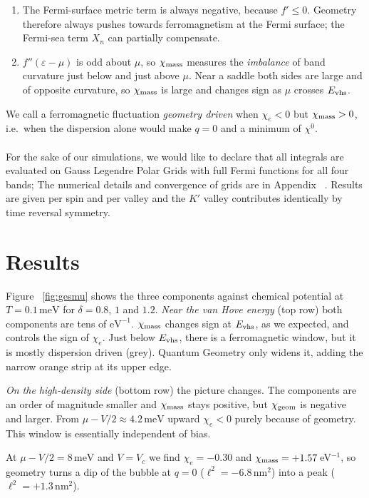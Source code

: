 \documentclass[11pt,a4paper]{article}
\numberwithin{equation}{section}
\newcommand{\chie}{\chi_{e}}
\newcommand{\chig}{\chi_{\rm geom}}
\newcommand{\chim}{\chi_{\rm mass}}
\newcommand{\Evhs}{E_{\rm vhs}}
\newcommand{\meV}{\,\mathrm{meV}}
\newcommand{\nm}{\,\mathrm{nm}}
\begin{document}
\begin{enumerate}
\item The Fermi-surface metric term is always negative, because $f'\le0$. Geometry therefore always pushes towards ferromagnetism at the Fermi surface; the Fermi-sea term $X_n$ can partially compensate.
\item $f''(\varepsilon-\mu)$ is odd about $\mu$, so $\chim$ measures the \emph{imbalance} of band curvature just below and just above $\mu$. Near a saddle both sides are large and of opposite curvature, so $\chim$ is large and changes sign as $\mu$ crosses $\Evhs$.
\end{enumerate}

We call a ferromagnetic fluctuation \emph{geometry driven} when $\chie<0$ but $\chim>0$, i.e.\ when the dispersion alone would make $q=0$ and a minimum of $\chi^0$. \\\\

For the sake of our simulations, we would like to declare that all integrals are evaluated on Gauss Legendre Polar Grids with full Fermi functions for all four bands; The numerical details and convergence of grids are in Appendix ~\cite{app:numerics}. Results are given per spin and per valley and  the $K'$ valley contributes identically by time reversal symmetry.

\section{Results}\label{sec:results}

Figure ~\ref{fig:gesmu} shows the three components against chemical potential at $T=0.1\meV$ for $\delta=0.8$, $1$ and $1.2$.
\emph{Near the van Hove energy} (top row) both components are tens of $\text{eV}^{-1}$. $\chim$ changes sign at $\Evhs$, as we expected, and controls the sign of $\chie$. Just below $\Evhs$, there is a ferromagnetic window, but it is mostly dispersion driven (grey). Quantum Geometry only widens it, adding the narrow orange strip at its upper edge.


\emph{On the high-density side} (bottom row) the picture changes. The components are an order of magnitude smaller and $\chim$ stays positive, but $\chig$ is negative and larger. From $\mu-V/2\approx4.2\meV$ upward $\chie<0$ purely because of geometry. This window is essentially independent of bias.

At $\mu-V/2=8\meV$ and $V=V_c$ we find $\chie=-0.30$ and $\chim=+1.57\,$eV$^{-1}$, so geometry turns a dip of the bubble at $q=0$ ($\ell^2=-6.8\nm^2$) into a peak ($\ell^2=+1.3\nm^2$).
\end{document}
